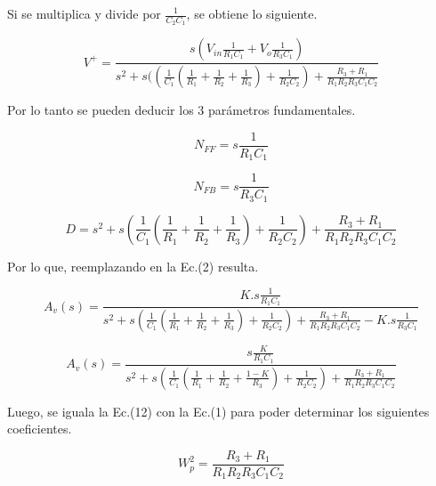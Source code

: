 \documentclass[12pt,A4paper,titlepage]{article}
\begin{document}
\bigskip
\hspace{1mm} Si se multiplica y divide por \(\frac{1}{C_2 C_1}\), se obtiene lo siguiente.

\bigskip
\begin{equation}
    V^+ = \frac{s (V_{in}\frac{1}{R_1 C_1} + V_o \frac{1}{R_3 C_1})}{s^2 + s((\frac{1}{C_1}(\frac{1}{R_1} + \frac{1}{R_2} + \frac{1}{R_3}) + \frac{1}{R_2 C_2})  + \frac{R_3 + R_1}{R_1 R_2 R_3 C_1 C_2}} 
\end{equation}

\bigskip
\hspace{1mm} Por lo tanto se pueden deducir los 3 parámetros fundamentales.

\begin{equation}
    N_{FF} = s \frac{1}{R_1 C_1}
\end{equation}

\begin{equation}
    N_{FB} = s \frac{1}{R_3 C_1}
\end{equation}

\begin{equation}
    D = s^2 + s (\frac{1}{C_1}(\frac{1}{R_1} + \frac{1}{R_2} + \frac{1}{R_3}) + \frac{1}{R_2 C_2}) + \frac{R_3 + R_1}{R_1 R_2 R_3 C_1 C_2}
\end{equation}

\bigskip
\hspace{1mm} Por lo que, reemplazando en la Ec.(2) resulta.

\begin{equation}
    A_v (s) = \frac{K . s \frac{1}{R_1 C_1}}{s^2 + s (\frac{1}{C_1}(\frac{1}{R_1} + \frac{1}{R_2} + \frac{1}{R_3}) + \frac{1}{R_2 C_2}) + \frac{R_3 + R_1}{R_1 R_2 R_3 C_1 C_2} - K. s\frac{1}{R_3 C_1}}
\end{equation}

\bigskip
\begin{equation}
    A_v (s) = \frac{ s \frac{K}{R_1 C_1}}{s^2 + s (\frac{1}{C_1}(\frac{1}{R_1} + \frac{1}{R_2} + \frac{1-K}{R_3}) + \frac{1}{R_2 C_2}) + \frac{R_3 + R_1}{R_1 R_2 R_3 C_1 C_2}}
\end{equation}

\bigskip
\hspace{1mm} Luego, se iguala la Ec.(12) con la Ec.(1) para poder determinar los siguientes coeficientes.

\begin{equation}
    W_p^2 = \frac{R_3 + R_1}{R_1 R_2 R_3 C_1 C_2}
\end{equation}
\end{document}
